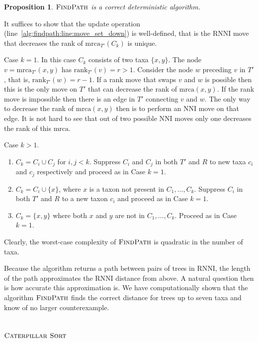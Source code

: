 \documentclass{amsart}
\newcommand{\mrca}{\mathrm{mrca}}
\newcommand{\rank}{\mathrm{rank}}
\newcommand{\nni}{\mathrm{NNI}}
\newcommand{\rnni}{\mathrm{RNNI}}
\newcommand{\csort}{\textsc{Caterpillar Sort}}
\newcommand{\findpath}{\textsc{FindPath}}
\newtheorem{proposition}[theorem]{Proposition}
\begin{document}
\begin{proposition}
$\findpath$ is a correct deterministic algorithm.
\end{proposition}

\proof
It suffices to show that the update operation (line~\ref{alg:findpath:line:move_set_down}) is well-defined, that is the $\rnni$ move that decreases the rank of $\mrca_{T'}(C_k)$ is unique.

Case $k = 1$.
In this case $C_k$ consists of two taxa $\{x, y\}$.
The node $v = \mrca_{T'}(x, y)$ has $\rank_{T'}(v) = r > 1$.
Consider the node $w$ preceding $v$ in $T'$, that is, $\rank_{T'}(w) = r - 1$.
If a rank move that swaps $v$ and $w$ is possible then this is the only move on $T'$ that can decrease the rank of $\mrca(x, y)$.
If the rank move is impossible then there is an edge in $T'$ connecting $v$ and $w$.
The only way to decrease the rank of $\mrca(x, y)$ then is to perform an $\nni$ move on that edge.
It is not hard to see that out of two possible $\nni$ moves only one decreases the rank of this $\mrca$.

Case $k > 1$.
\begin{enumerate}
\item $C_k = C_i \cup C_j$ for $i, j < k$.
Suppress $C_i$ and $C_j$ in both $T'$ and $R$ to new taxa $c_i$ and $c_j$ respectively and proceed as in Case $k = 1$.
\item $C_k = C_i \cup \{x\}$, where $x$ is a taxon not present in $C_1, \ldots, C_k$.
Suppress $C_i$ in both $T'$ and $R$ to a new taxon $c_i$ and proceed as in Case $k = 1$.
\item $C_k = \{x, y\}$ where both $x$ and $y$ are not in $C_1, \ldots, C_k$.
Proceed as in Case $k = 1$.
\end{enumerate}
\endproof

Clearly, the worst-case complexity of $\findpath$ is quadratic in the number of taxa.

Because the algorithm returns a path between pairs of trees in $\rnni$, the length of the path approximates the $\rnni$ distance from above.
A natural question then is how accurate this approximation is.
We have computationally shown that the algorithm $\findpath$ finds the correct distance for trees up to seven taxa \autocite{Collienne2019} and know of no larger counterexample.


\subsection{$\csort$}
\label{section:alg_csort}
\end{document}

